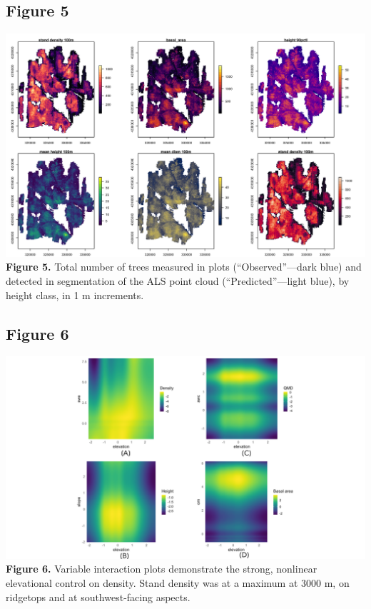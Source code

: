 \documentclass[
  12pt,
]{article}
\begin{document}
\newpage

\hypertarget{figure-5}{%
\subsection{Figure 5}\label{figure-5}}

\includegraphics{./Figures/Fig5.png} \textbf{Figure 5.} Total number of
trees measured in plots (``Observed''---dark blue) and detected in
segmentation of the ALS point cloud (``Predicted''---light blue), by
height class, in 1 m increments. \clearpage

\newpage

\hypertarget{figure-6}{%
\subsection{Figure 6}\label{figure-6}}

\includegraphics{./Figures/Fig6.png} \textbf{Figure 6.} Variable
interaction plots demonstrate the strong, nonlinear elevational control
on density. Stand density was at a maximum at 3000 m, on ridgetops and
at southwest-facing aspects. \clearpage
\end{document}
